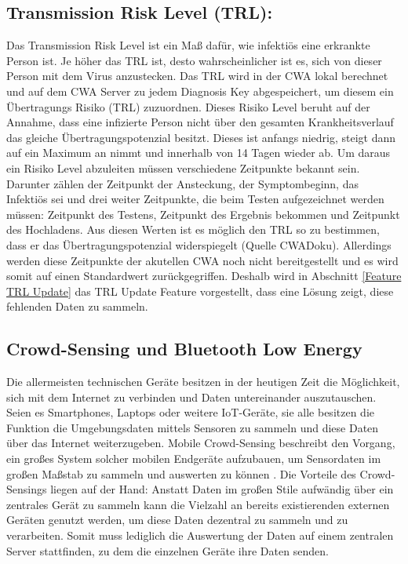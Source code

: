\documentclass[conference,compsoc]{IEEEtran}
\begin{document}
\subsection{Transmission Risk Level (TRL):} \label{TRL}
Das Transmission Risk Level ist ein Maß dafür, wie infektiös eine erkrankte Person ist. Je höher das TRL ist, desto wahrscheinlicher ist es, sich von dieser Person mit dem Virus anzustecken.
Das TRL wird in der CWA lokal berechnet und auf dem CWA Server zu jedem Diagnosis Key abgespeichert, um diesem ein Übertragungs Risiko (TRL) zuzuordnen. 
Dieses Risiko Level beruht auf der Annahme, dass eine infizierte Person nicht über den gesamten Krankheitsverlauf das gleiche Übertragungspotenzial besitzt. 
Dieses ist anfangs niedrig, steigt dann auf ein Maximum an nimmt und innerhalb von 14 Tagen wieder ab. Um daraus ein Risiko Level abzuleiten müssen verschiedene Zeitpunkte bekannt sein. 
Darunter zählen der Zeitpunkt der Ansteckung, der Symptombeginn, das Infektiös sei und drei weiter Zeitpunkte, die beim Testen aufgezeichnet werden müssen: 
Zeitpunkt des Testens, Zeitpunkt des Ergebnis bekommen und Zeitpunkt des Hochladens. Aus diesen Werten ist es möglich den TRL so zu bestimmen, 
dass er das Übertragungspotenzial widerspiegelt \cite{}(Quelle CWADoku).
Allerdings werden diese Zeitpunkte der akutellen CWA noch nicht bereitgestellt und es wird somit auf einen Standardwert zurückgegriffen.
Deshalb wird in Abschnitt \ref{Feature TRL Update} das TRL Update  Feature vorgestellt, dass eine Lösung zeigt, diese fehlenden Daten zu sammeln.

\subsection{Crowd-Sensing und Bluetooth Low Energy}
Die allermeisten technischen Geräte besitzen in der heutigen Zeit die Möglichkeit, sich mit dem Internet zu verbinden und Daten untereinander auszutauschen.
Seien es Smartphones, Laptops oder weitere IoT-Geräte, sie alle besitzen die Funktion die Umgebungsdaten mittels Sensoren zu sammeln und diese Daten über das Internet weiterzugeben.
Mobile Crowd-Sensing beschreibt den Vorgang, ein großes System solcher mobilen Endgeräte aufzubauen, um Sensordaten im großen Maßstab zu sammeln und auswerten zu können \cite{MCS}.
Die Vorteile des Crowd-Sensings liegen auf der Hand: Anstatt Daten im großen Stile aufwändig über ein zentrales Gerät zu sammeln kann die Vielzahl an bereits existierenden externen Geräten genutzt werden, um diese Daten dezentral zu sammeln und zu verarbeiten.
Somit muss lediglich die Auswertung der Daten auf einem zentralen Server stattfinden, zu dem die einzelnen Geräte ihre Daten senden. 
\end{document}

